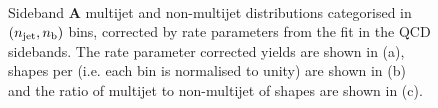 \clearpage
\begin{figure}[!h]
  \centering
   \\
  \caption{Sideband \textbf{A} multijet and non-multijet distributions
    categorised in $(n_{\text{jet}}, n_{\text{b}})$ bins, corrected by rate parameters
    from the fit in the QCD sidebands. The rate parameter corrected yields
    are shown in (a), \nb shapes per \njet (i.e. each \njet bin is normalised
    to unity) are shown in (b) and the ratio of multijet to non-multijet of
    \nb shapes are shown in (c).}
  \label{fig:qcd_nb_shapes_doublesb}
\end{figure}

